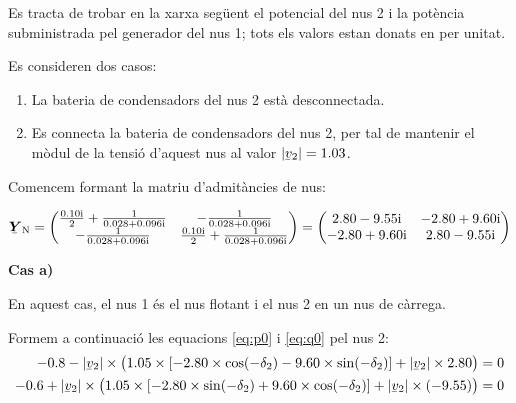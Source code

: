 \begin{exemple}\label{ex:control-v-cond}
    Es tracta de trobar en la xarxa següent el potencial del nus 2 i la
    potència subministrada pel generador del nus 1; tots els valors
    estan donats en per unitat.

    \begin{center}
        
    \end{center}

    Es consideren dos casos:

    \begin{enumerate}
       \renewcommand{\labelenumi}{\alph{enumi})}
       \item La bateria de condensadors del nus 2 està desconnectada.
       \item Es connecta la bateria de condensadors del nus 2, per tal de mantenir el mòdul de
       la tensió d'aquest nus al valor $|\cmplx{v}_2|=\num{1,03}$.
    \end{enumerate}

    Comencem formant la matriu d'admitàncies de nus:

    \[
    \mcmplx{Y}\ped{N} = \begin{pmatrix}
      \frac{\complexnum{j 0,10}}{2} + \frac{1}{\complexnum{0,028+j0,096}} & -\frac{1}{\complexnum{0,028+j0,096}} \\
      -\frac{1}{\complexnum{0,028+j0,096}} & \frac{\complexnum{j 0,10}}{2} + \frac{1}{\complexnum{0,028+j0,096}} \\
    \end{pmatrix} =
    \begin{pmatrix}
      \complexnum{2,80 -j9,55} & \complexnum{-2,80 +j9,60} \\
      \complexnum{-2,80 +j9,60} & \complexnum{2,80 -j9,55} \\
    \end{pmatrix}
    \]

    \textbf{Cas a)}

     En aquest cas, el nus 1 és el nus flotant i el nus 2 en un nus
    de càrrega.

    Formem a continuació les equacions \eqref{eq:p0} i \eqref{eq:q0} pel
    nus 2:
    \begin{align*}
    \num{-0,8} - |\cmplx{v}_2| \times \bigl( \num{1,05}\times [\num{-2,80}\times \cos(-\delta_2) - \num{9,60} \times
    \sin( -\delta_2)]  + |\cmplx{v}_2| \times \num{2,80} \bigr) &= 0 \\
    -\num{0,6} + |\cmplx{v}_2| \times\bigl( \num{1,05} \times[-\num{2,80}\times\sin(-\delta_2) +
    \num{9,60}\times\cos( -\delta_2)]  + |\cmplx{v}_2|\times (-\num{9,55}) \bigr) &= 0
    \end{align*}


\end{exemple}
